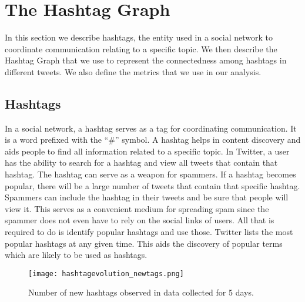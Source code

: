 \documentclass[journal, a4paper, 12pt]{article}
\begin{document}

    
\section{The Hashtag Graph }

In this section we describe hashtags, the entity used in a social network to coordinate communication relating to a specific topic. We then describe the Hashtag Graph that we use to represent the connectedness among hashtags in different tweets. We also define the metrics that we use in our analysis.

\subsection{Hashtags}
In a social network, a hashtag serves as a tag for coordinating communication. It is  a word prefixed with the ``\#'' symbol. A hashtag helps in content discovery and aids people to find all information related to a specific topic. In Twitter, a user has the ability to search for a hashtag and view all tweets that contain that hashtag. The hashtag can serve as a weapon for spammers. If a hashtag becomes popular, there will be a large number of tweets that contain that specific hashtag. Spammers can include the hashtag in their tweets and be sure that people will view it. This serves as a convenient medium for spreading spam since the spammer does not even have to rely on the social links of users. All that is required to do is identify popular hashtags and use those. Twitter lists the most popular hashtags at any given time. This aids the discovery of popular terms which are likely to be used as hashtags.\\

      \begin{figure}[!hbt]
            \begin{center}
            \texttt{[image: hashtagevolution\_newtags.png]}
            \caption{Number of new hashtags observed in data collected for 5 days.}
            \label{fig:hashtagevolution}
            \end{center}
      \end{figure}
\end{document}
